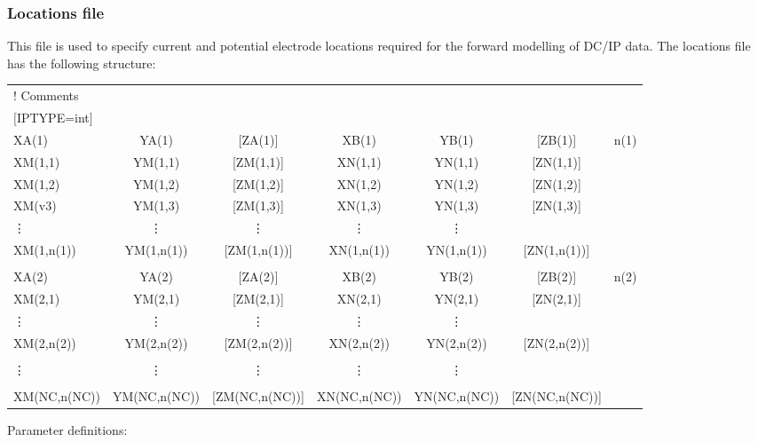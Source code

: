 \subsubsection{Locations file}
This file is used to specify current and potential electrode locations required for the forward modelling of DC/IP data. The locations file has the following structure:
%
\begin{fileExample}\footnotesize
\begin{tabular}{|lcccccc|}
\hline
! Comments & & & & & & \\
$[$IPTYPE=int$]$ & & & & & & \\
XA(1)  & YA(1)  & [ZA(1)]  & XB(1)  & YB(1)  & [ZB(1)]  & n(1)\\
XM(1,1)  & YM(1,1)  & [ZM(1,1)]  & XN(1,1)  & YN(1,1)  & [ZN(1,1)]  & \\
XM(1,2)  & YM(1,2)  & [ZM(1,2)]  & XN(1,2)  & YN(1,2)  & [ZN(1,2)]  & \\
XM(v3)  & YM(1,3)  & [ZM(1,3)]  & XN(1,3)  & YN(1,3)  & [ZN(1,3)]  & \\
\vdots  & \vdots  & \vdots  & \vdots  & \vdots  & & \\
XM(1,n(1))  & YM(1,n(1))  & [ZM(1,n(1))]  & XN(1,n(1))  & YN(1,n(1))  & [ZN(1,n(1))]  &  \\
 & & & & & & \\
XA(2)  & YA(2)  & [ZA(2)]  & XB(2)  & YB(2)  & [ZB(2)]  & n(2)\\
XM(2,1)  & YM(2,1)  & [ZM(2,1)]  & XN(2,1)  & YN(2,1)  & [ZN(2,1)]  & \\
\vdots  & \vdots  & \vdots  & \vdots  & \vdots  & & \\
XM(2,n(2))  & YM(2,n(2))  & [ZM(2,n(2))]  & XN(2,n(2))  & YN(2,n(2))  & [ZN(2,n(2))]  &  \\
 & & & & & & \\
\vdots  & \vdots  & \vdots  & \vdots  & \vdots  & & \\
 &   &   &  &  & & \\
 XM(NC,n(NC))  & YM(NC,n(NC))  & [ZM(NC,n(NC))]  & XN(NC,n(NC))  & YN(NC,n(NC))  & [ZN(NC,n(NC))]  &  \\
\hline
\end{tabular}
\end{fileExample}
%
Parameter definitions:
%
